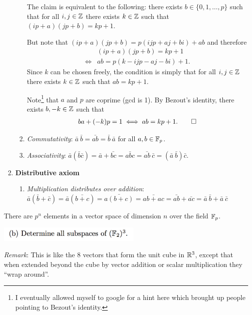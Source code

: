 \documentclass[12pt]{article}
\begin{document}
\begin{enumerate}
\begin{enumerate}
    The claim is equivalent to the following: there exists
    $b \in \{0, 1, \ldots, p\}$ such that for all $i, j \in \mathbb{Z}$ there exists
    $k \in \mathbb{Z}$ such that $(ip + a)(jp + b) = kp + 1$.

    But note that $(ip + a)(jp + b) = p(ijp + aj + bi) + ab$ and therefore
    \begin{align*}
      &(ip + a)(jp + b) = kp + 1\\
      \iff &ab = p(k - ijp - aj - bi) + 1.
    \end{align*}
    Since $k$ can be chosen freely, the condition is simply that for all
    $i, j \in \mathbb{Z}$ there exists $k \in \mathbb{Z}$ such that $ab = kp + 1$.

    Note\footnote{I eventually allowed myself to google for a hint here which
      brought up people pointing to Bezout's identity.} that $a$ and $p$ are
    coprime (gcd is 1). By Bezout's identity, there exists $b, -k \in \mathbb{Z}$
    such that
    \begin{align*}
      ba + (-k)p = 1 \iff ab = kp + 1. \qed
    \end{align*}


  \item \textit{Commutativity}:
    $\bar a ~ \bar b = \bar{ab} = \bar{b} ~ \bar{a}$ for all $a, b \in \mathbb{F}_p$.
  \item \textit{Associativity}:
    $\bar a (\bar b \bar c) = \bar a + \bar {bc} = \bar{abc} =
    \bar{ab}~\bar{c} = (\bar a ~ \bar b) \bar{c}$.
  \end{enumerate}
\item \textbf{Distributive axiom}
  \begin{enumerate}
  \item \textit{Multiplication distributes over addition}: $\bar a (\bar b + \bar c) = \bar a (\bar{b + c}) = \bar{a(b+c)} = \bar{ab +
    ac} = \bar{ab} + \bar{ac} = \bar{a}~\bar{b} + \bar{a}~\bar{c}$
  \end{enumerate}
\end{enumerate}

There are $p^n$ elements in a vector space of dimension $n$ over the field $\mathbb{F}_p$.
\newpage
\begin{mdframed}
\includegraphics[width=200pt]{img/linear-algebra-a0-1-1-b.png}
\end{mdframed}

\textit{Remark}: This is like the 8 vectors that form the unit cube in
$\mathbb{R}^3$, except that when extended beyond the cube by vector addition or
scalar multiplication they ``wrap around''.
\end{document}
